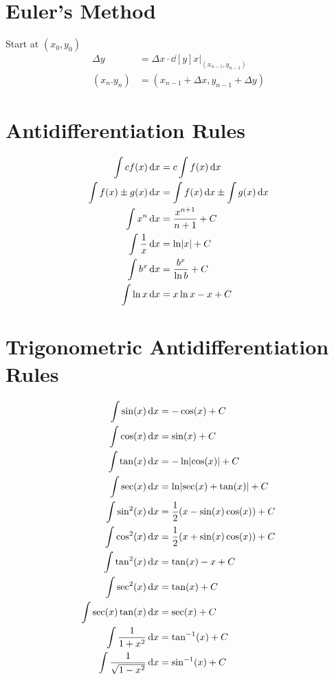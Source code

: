 \documentclass[12pt]{article}
\DeclarePairedDelimiter\abs{\lvert}{\rvert}
\newcommand*{\asin}{\sin^{-1}}
\newcommand*{\atan}{\tan^{-1}}
\newcommand*{\D}[1]{\mathop{}\!\mathrm{d}#1}
\newcommand*{\fixmath}{%
  \makebox{}\vspace{\glueexpr-\baselineskip-\abovedisplayskip}}
\newenvironment{fixbskip}{\setlength{\belowdisplayskip}{0pt}\ignorespaces}%
  {\ignorespacesafterend}
\newenvironment{fixskip}{\setlength{\abovedisplayskip}{0pt}%
  \setlength{\belowdisplayskip}{0pt}\fixmath\ignorespaces}%
  {\ignorespacesafterend}
\begin{document}
\section*{Euler's Method}
Start at \((x_0,y_0)\)
\begin{fixbskip}
  \begin{align*}
    \Delta y &= \Delta x \cdot \dd[y]{x} \bigg|_{(x_{n-1},y_{n-1})}\\
    (x_n.y_n) &= (x_{n-1} + \Delta x, y_{n-1} + \Delta y)
  \end{align*}
\end{fixbskip}
\section*{Antidifferentiation Rules}
\begin{fixskip}
  \begin{align*}
    \int cf(x) \D{x} &= c \int f(x) \D{x}\\
    \int f(x) \pm g(x) \D{x} &= \int f(x) \D{x} \pm \int g(x) \D{x}\\
    \int x^n \D{x} &= \frac{x^{n+1}}{n+1} + C\\
    \int \frac{1}{x} \D{x} &= \ln\abs*{x} + C\\
    \int b^x \D{x} &= \frac{b^x}{\ln b} + C\\
    \int \ln x \D{x} &= x\ln x - x + C
  \end{align*}
\end{fixskip}
\section*{Trigonometric Antidifferentiation Rules}
\begin{fixskip}
  \begin{align*}
    \int \sin(x) \D{x} &= -\cos(x) + C\\
    \int \cos(x) \D{x} &= \sin(x) + C\\
    \int \tan(x) \D{x} &= -\ln\abs*{\cos(x)} + C\\
    \int \sec(x) \D{x} &= \ln\abs*{\sec(x)+\tan(x)} + C\\
    \int \sin^2(x) \D{x} &= \frac{1}{2} (x - \sin(x)\cos(x)) + C\\
    \int \cos^2(x) \D{x} &= \frac{1}{2} (x + \sin(x)\cos(x)) + C\\
    \int \tan^2(x) \D{x} &= \tan(x) - x + C\\
    \int \sec^2(x) \D{x} &= \tan(x) + C\\
    \int \sec(x) \tan(x) \D{x} &= \sec(x) + C\\
    \int \frac{1}{1+x^2} \D{x} &= \atan(x) + C\\
    \int \frac{1}{\sqrt{1-x^2}} \D{x} &= \asin(x) + C
  \end{align*}
\end{fixskip}
\end{document}
